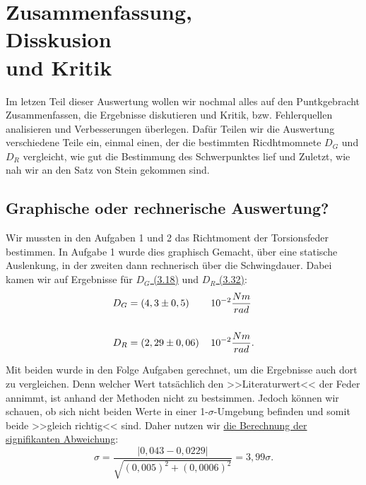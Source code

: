 \chapter{Zusammenfassung, \\ Disskusion \\ und Kritik}
\label{Disskusion}

Im letzen Teil dieser Auswertung wollen wir nochmal alles auf den Puntkgebracht Zusammenfassen, die Ergebnisse diskutieren und Kritik, 
bzw. Fehlerquellen analisieren und Verbesserungen überlegen.
Dafür Teilen wir die Auswertung verschiedene Teile ein, einmal einen, der die bestimmten Ricdhtmomnete $D_G$ und $D_R$ vergleicht, wie gut die Bestimmung des Schwerpunktes lief
und Zuletzt, wie nah wir an den Satz von Stein gekommen sind.

\section{Graphische oder rechnerische Auswertung?}
Wir mussten in den Aufgaben 1 und 2 das Richtmoment der Torsionsfeder bestimmen. In Aufgabe 1 wurde dies graphisch Gemacht, über eine statische Auslenkung, in der zweiten dann rechnerisch über die Schwingdauer.
Dabei kamen wir auf Ergebnisse für \hyperref[e:d_g]{$D_G$ (3.18)} und \hyperref[e:d_r]{$D_R$ (3.32)}:
\begin{align}
    D_G &= (4,3 \pm 0,5) \, &&10^{-2} \frac{Nm}{rad}\\
        \notag \\
    D_R &= (2,29 \pm 0,06) \, &&10^{-2} \frac{Nm}{rad}.
\end{align}

Mit beiden wurde in den Folge Aufgaben gerechnet, um die Ergebnisse auch dort zu vergleichen. Denn welcher Wert tatsächlich den >>Literaturwert<<
der Feder annimmt, ist anhand der Methoden nicht zu bestsimmen. Jedoch können wir schauen, ob sich nicht beiden Werte in einer 1-$\sigma$-Umgebung befinden und somit beide >>gleich richtig<< sind.
Daher nutzen wir \hyperref[eq:signifikante_abweichung]{die Berechnung der signifikanten Abweichung}:
\begin{equation}
    \sigma = \frac{\left| 0,043 - 0,0229 \right|}{\sqrt{(0,005)^2+(0,0006)^2}} = 3,99\sigma.
\end{equation}


